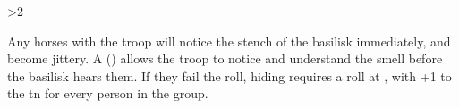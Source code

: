 \ifnum\value{temperature}>2

Any horses with the troop will notice the stench of the \gls{basilisk} immediately, and become jittery.
A  (\tn[10]) allows the troop to notice and understand the smell before the \gls{basilisk} hears them.
If they fail the roll, hiding requires a  roll at \tn[10], with +1 to the \gls{tn} for every person in the group.

\basilisk

\fi
